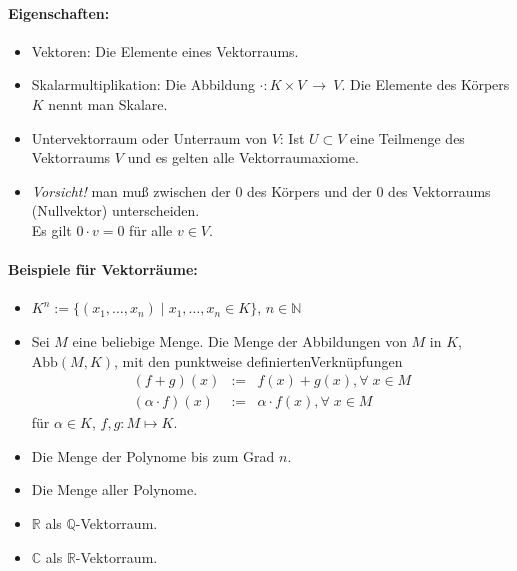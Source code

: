 \documentclass[a4paper,12pt,DIV15]{scrartcl}
\begin{document}
\paragraph{Eigenschaften:}
\begin{itemize}
\item {\color{red} Vektoren}: Die Elemente eines Vektorraums.
\item {\color{red} Skalarmultiplikation}: Die Abbildung $\cdot : K\times V \ \rightarrow \ V$. Die Elemente des Körpers $K$ nennt man
  {\color{red} Skalare}.
\item {\color{red} Untervektorraum} oder {\color{red} Unterraum} von $V$: Ist $U \subset V$ eine Teilmenge des Vektorraums $V$ und es gelten
  alle Vektorraumaxiome.
\item \textsl{Vorsicht!} man muß zwischen der $0$ des Körpers und der $0$ des Vektorraums (Nullvektor) unterscheiden. \\
Es gilt $0 \cdot v  = 0$ für alle $v \in V$. 
\end{itemize}

\paragraph{Beispiele für Vektorräume:}
\begin{itemize}
\item $K^n := \{(x_1,\ldots,x_n) \;|\; x_1, \ldots, x_n \in K\}$, $n \in \mathbb{N}$
\item Sei $M$ eine beliebige Menge. Die Menge der Abbildungen von $M$
  in $K$, $\text{Abb}(M,K)$, mit den punktweise definiertenVerknüpfungen
\begin{eqnarray*}
(f+g)(x) & :=& f(x)+g(x), \forall\; x \in M\\
(\alpha \cdot f)(x) & :=& \alpha \cdot f(x), \forall\; x \in M  
\end{eqnarray*}
für $\alpha \in K$, $f,g:M \mapsto K$.
\item Die Menge der Polynome bis zum Grad $n$.
\item Die Menge aller Polynome.
\item $\mathbb{R}$ als $\mathbb{Q}$-Vektorraum.
\item $\mathbb{C}$ als $\mathbb{R}$-Vektorraum.
\end{itemize}
\end{document}
